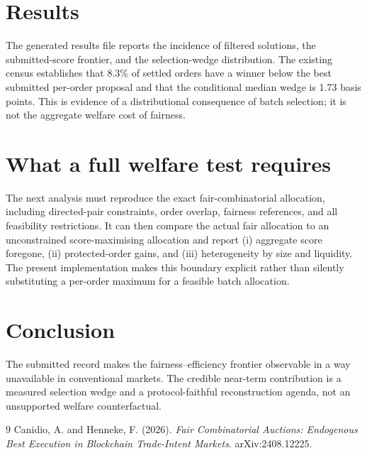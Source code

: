 \documentclass[11pt]{article}
\begin{document}
\section{Results} The generated results file reports the incidence of filtered solutions, the submitted-score frontier, and the selection-wedge distribution.  The existing census establishes that 8.3\% of settled orders have a winner below the best submitted per-order proposal and that the conditional median wedge is 1.73 basis points.  This is evidence of a distributional consequence of batch selection; it is not the aggregate welfare cost of fairness.
\section{What a full welfare test requires} The next analysis must reproduce the exact fair-combinatorial allocation, including directed-pair constraints, order overlap, fairness references, and all feasibility restrictions.  It can then compare the actual fair allocation to an unconstrained score-maximising allocation and report (i) aggregate score foregone, (ii) protected-order gains, and (iii) heterogeneity by size and liquidity.  The present implementation makes this boundary explicit rather than silently substituting a per-order maximum for a feasible batch allocation.
\section{Conclusion} The submitted record makes the fairness--efficiency frontier observable in a way unavailable in conventional markets.  The credible near-term contribution is a measured selection wedge and a protocol-faithful reconstruction agenda, not an unsupported welfare counterfactual.
\begin{thebibliography}{9} Canidio, A. and Henneke, F. (2026). \emph{Fair Combinatorial Auctions: Endogenous Best Execution in Blockchain Trade-Intent Markets}. arXiv:2408.12225.\end{thebibliography}
\end{document}
